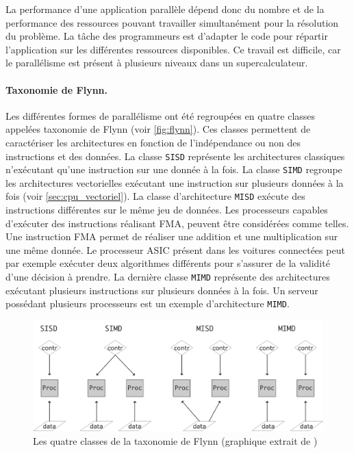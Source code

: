         La performance d'une application parallèle dépend donc du nombre et de la performance des ressources pouvant travailler simultanément pour la résolution du problème. La tâche des programmeurs est d'adapter le code pour répartir l'application sur les différentes ressources disponibles. Ce travail est difficile, car le parallélisme est présent à plusieurs niveaux dans un supercalculateur.
        
        
        \paragraph{Taxonomie de Flynn.}
             Les différentes formes de parallélisme ont été regroupées en quatre classes appelées taxonomie de Flynn \cite{Flynn2011} (voir \autoref{fig:flynn}). Ces classes permettent de caractériser les architectures en fonction de l'indépendance ou non des instructions et des données. La classe \verb=SISD= représente les architectures classiques n'exécutant qu'une instruction sur une donnée à la fois. 
            La classe \verb=SIMD= regroupe les architectures vectorielles exécutant une instruction sur plusieurs données à la fois (voir \autoref{sec:cpu_vectoriel}). La classe d'architecture \verb|MISD| exécute des instructions différentes sur le même jeu de données. Les processeurs capables d'exécuter des instructions réalisant \gls{FMA}, peuvent être considérées comme telles. Une instruction FMA permet de réaliser une addition et une multiplication sur une même donnée. Le processeur ASIC présent dans les voitures connectées peut par exemple exécuter deux algorithmes différents pour s'assurer de la validité d'une décision à prendre. La dernière classe \verb|MIMD| représente des architectures exécutant plusieurs instructions sur plusieurs données à la fois. Un serveur possédant plusieurs processeurs est un exemple d'architecture \verb|MIMD|. 
            
            \begin{figure}
            \center
            \includegraphics[width=12cm]{images/flynn.png}
            \caption{\label{fig:flynn} Les quatre classes de la taxonomie de Flynn (graphique extrait de \cite{Eijkhout2013})}
            \end{figure}
            

